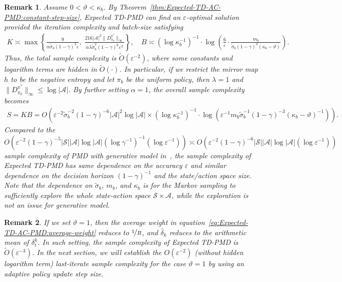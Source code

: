 \documentclass[10pt]{article}
\newcommand{\calA}{\mathcal{A}}
\newcommand{\calS}{\mathcal{S}}
\newcommand{\ls}{\left}
\newcommand{\rs}{\right}
\theoremstyle{plain}
\newtheorem{remark}{Remark}[section]
\theoremstyle{definition}
\begin{document}
\begin{remark}
     Assume $0<\vartheta<\kappa_b$. By Theorem~\ref{thm:Expected-TD-AC-PMD:constant-step-size}, Expected TD-PMD can find an $\varepsilon$-optimal solution provided the iteration complexity and batch-size satisfying
    \begin{align*}
        K \asymp \max \ls\{ \frac{9}{\alpha \tilde\sigma_b (1-\gamma)^3 \varepsilon}, \; \frac{216 |\calA|^2 \| D^{\pi^*}_{\pi_0} \|_\infty}{\alpha\lambda\tilde\sigma_b^2 (1-\gamma)^6 \varepsilon^{2}} \rs\}, \quad B \asymp \ls( \log \kappa_b^{-1}\rs)^{-1} \cdot \log \ls(\frac{6}{\varepsilon} \cdot \frac{m_b}{\tilde\sigma_b(1-\gamma)^3(\kappa_b-\vartheta)}\rs).
    \end{align*}
    Thus, the total sample complexity is $\tilde{O}(\varepsilon^{-2})$, where some constants and logarithm terms are hidden in $\tilde{O}(\cdot)$. In particular, if we restrict the mirror map $h$ to be the negative entropy and let $\pi_b$ be the uniform policy, then $\lambda = 1$ and $\| D^{\pi^*}_{\pi_0} \|_\infty \leq \log |\calA|$. By further setting $\alpha = 1$, the overall sample complexity becomes
    \begin{align*}
        S = KB = O\ls( \varepsilon^{-2} \tilde\sigma_b^{-2} (1-\gamma)^{-6} |\calA|^2 \log |\calA| \times \ls( \log \kappa_b^{-1}\rs)^{-1} \cdot \log \ls(\varepsilon^{-1} m_b \tilde\sigma_b^{-1}(1-\gamma)^{-3}(\kappa_b-\vartheta)^{-1}\rs) \rs).
    \end{align*}
    Compared to the $O(\varepsilon^{-2}(1-\gamma)^{-5}|\calS||\calA| \log |\calA| (\log \gamma^{-1})^{-1} (\log \varepsilon^{-1})) \asymp O(\varepsilon^{-2}(1-\gamma)^{-6}|\calS||\calA|\log |\calA| (\log \varepsilon^{-1}))$ sample complexity of PMD with generative model in~\textup{\citet[Proposition~2]{Lan_2021}}, the sample complexity of Expected TD-PMD has same dependence on the accuracy $\varepsilon$ and similar dependence on the decision horizon $(1-\gamma)^{-1}$ and the state/action space size. Note that the dependence on $\tilde\sigma_b$, $m_b$, and $\kappa_b$ is for the Markov sampling to sufficiently explore the whole state-action space $\calS\times\calA$, while the exploration is not an issue for generative model.
    \label{rem:Expected-TD-AC-PMD:constant-step-size}
\end{remark}

\begin{remark}
    If we set $\vartheta = 1$, then the average weight in equation~\eqref{eq:Expected-TD-AC-PMD:average-weight} reduces to $ \nicefrac{1}{B}$, and $\bar\delta_k$ reduces to the arithmetic mean of $\delta_t^k$. In such setting, the sample complexity of Expected TD-PMD is $\tilde{O}(\varepsilon^{-3})$. In the next section, we will establish the $O(\varepsilon^{-2})$ \textup{(}without hidden logarithm term\textup{)} last-iterate sample complexity for the case $\vartheta=1$ by using an adaptive policy update step size. 
\end{remark}
\end{document}
